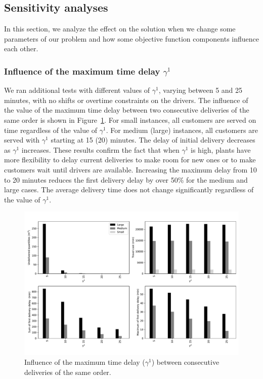 \documentclass{article}
\begin{document}
\subsection{Sensitivity analyses}

In this section, we analyze the effect on the solution when we change some parameters of our problem and how some objective function components influence each other.

\subsubsection{Influence of the maximum time delay $\gamma^1$}

We ran additional tests with different values of $\gamma^1$, varying between 5 and 25 minutes, with no shifts or overtime constraints on the drivers. The influence of the value of the maximum time delay between two consecutive deliveries of the same order is shown in Figure~\ref{fig:gamma1_influence}. For small instances, all customers are served on time regardless of the value of $\gamma^1$. For medium (large) instances, all customers are served with $\gamma^1$ starting at 15 (20) minutes. The delay of initial delivery decreases as $\gamma^1$ increases. These results confirm the fact that when $\gamma^1$ is high, plants have more flexibility to delay current deliveries to make room for new ones or to make customers wait until drivers are available. Increasing the maximum delay from 10 to 20 minutes reduces the first delivery delay by over 50\% for the medium and large cases. The average delivery time does not change significantly regardless of the value of $\gamma^1$.

\begin{figure}[!ht]
    \centering
    \includegraphics[width=1\textwidth]{gamma1.pdf}
    \small
    \caption{Influence of the maximum time delay ($\gamma^1$) between consecutive deliveries of the same order. }
    \label{fig:gamma1_influence}
\end{figure}
\end{document}
